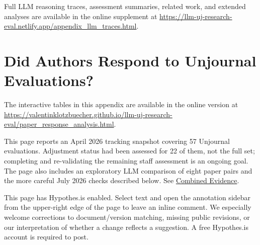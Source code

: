 \documentclass[
  11pt,
  letterpaper,
]{article}
\begin{document}
Full LLM reasoning traces, assessment summaries, related work, and
extended analyses are available in the online supplement at
\url{https://llm-uj-research-eval.netlify.app/appendix_llm_traces.html}.

\section{Did Authors Respond to Unjournal
Evaluations?}\label{did-authors-respond-to-unjournal-evaluations}

The interactive tables in this appendix are available in the online
version at
\url{https://valentinklotzbuecher.github.io/llm-uj-research-eval/paper_response_analysis.html}.

\begin{tcolorbox}[enhanced jigsaw, colframe=quarto-callout-note-color-frame, breakable, rightrule=.15mm, toptitle=1mm, opacitybacktitle=0.6, opacityback=0, colback=white, bottomtitle=1mm, leftrule=.75mm, toprule=.15mm, coltitle=black, bottomrule=.15mm, titlerule=0mm, title=\textcolor{quarto-callout-note-color}{\faInfo}\hspace{0.5em}{Note}, colbacktitle=quarto-callout-note-color!10!white, arc=.35mm, left=2mm]

This page reports an April 2026 tracking snapshot covering 57 Unjournal
evaluations. Adjustment status had been assessed for 22 of them, not the
full set; completing and re-validating the remaining staff assessment is
an ongoing goal. The page also includes an exploratory LLM comparison of
eight paper pairs and the more careful July 2026 checks described below.
See \hyperref[combined-evidence]{Combined Evidence}.

\end{tcolorbox}

\begin{tcolorbox}[enhanced jigsaw, colframe=quarto-callout-note-color-frame, breakable, rightrule=.15mm, toptitle=1mm, opacitybacktitle=0.6, opacityback=0, colback=white, bottomtitle=1mm, leftrule=.75mm, toprule=.15mm, coltitle=black, bottomrule=.15mm, titlerule=0mm, title=\textcolor{quarto-callout-note-color}{\faInfo}\hspace{0.5em}{Comment or flag a correction}, colbacktitle=quarto-callout-note-color!10!white, arc=.35mm, left=2mm]

This page has Hypothes.is enabled. Select text and open the annotation
sidebar from the upper-right edge of the page to leave an inline
comment. We especially welcome corrections to document/version matching,
missing public revisions, or our interpretation of whether a change
reflects a suggestion. A free Hypothes.is account is required to post.

\end{tcolorbox}
\end{document}
